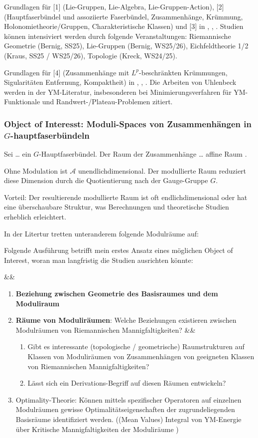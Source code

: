 \documentclass[10pt, letterpaper]{article}
\newenvironment{romanenum}[1][]
  {%
    \ifx&#1&%
    \else
      \textbf{#1}\quad %
    \fi
    \begin{enumerate}[label=\roman*)] %
  }
  {%
    \end{enumerate}%
  }
\theoremstyle{custom}
\theoremstyle{definition}
\begin{document}
Grundlagen für [1] (Lie-Gruppen, Lie-Algebra, Lie-Gruppen-Action), [2] (Hauptfaserbündel und assoziierte Faserbündel, Zusammenhänge, Krümmung, Holonomietheorie/Gruppen, Charakteristische Klassen) und [3] in \cite{baum2014eichfeld}, \cite{hamilton2017gauge}, \cite{husemoller1975fibre}. Studien können intensiviert werden durch folgende Veranstaltungen: Riemannische Geometrie (Bernig, SS25), Lie-Gruppen (Bernig, WS25/26), Eichfeldtheorie 1/2 (Kraus, SS25 / WS25/26), Topologie (Kreck, WS24/25).

Grundlagen für [4] (Zusammenhänge mit $L^p$-beschränkten Krümmungen, Sigularitäten Entfernung, Kompaktheit) in \cite{uhlenbeck1982connections}, \cite{uhlenbeck1982removable}, \cite{wehrheim2021uhlenbeck}. Die Arbeiten von Uhlenbeck werden in der YM-Literatur, insbesonderen bei Minimierungsverfahren für YM-Funktionale und Randwert-/Plateau-Problemen zitiert.  



\subsubsection{Object of Interesst: Moduli-Spaces von Zusammenhängen in $G$-hauptfaserbündeln} 

Sei … ein $G$-Hauptfaserbündel. Der Raum der Zusammenhänge … affine Raum .

Ohne Modulation ist $\mathcal{A}$ unendlichdimensional. Der modullierte Raum reduziert diese Dimension durch die Quotientierung nach der Gauge-Gruppe $G$.

Vorteil: Der resultierende modullierte Raum ist oft endlichdimensional oder hat eine überschaubare Struktur, was Berechnungen und theoretische Studien erheblich erleichtert.

In der Litertur tretten unteranderem folgende Modulräume auf:




Folgende Ausführung betrifft mein erstes Ansatz eines möglichen Object of Interest, woran man langfristig die Studien ausrichten könnte: 

\begin{romanenum}
    \item \textbf{Beziehung zwischen Geometrie des Basisraumes und dem Moduliraum}
    \item \textbf{Räume von Moduliräumen}: Welche Beziehungen existieren zwischen Modulräumen von Riemannischen Mannigfaltigkeiten? 
    \begin{romanenum}
        \item Gibt es interessante (topologische / geometrische) Raumstrukturen auf Klassen von Moduliräumen von Zusammenhängen von geeigneten Klassen von Riemannischen Mannigfaltigkeiten? 
        \item Lässt sich ein Derivations-Begriff auf diesen Räumen entwickeln?
    \end{romanenum}
    \item Optimality-Theorie: Können mittels spezifischer Operatoren auf einzelnen Modulräumen gewisse Optimalitätseigenschaften der zugrundeliegenden Basisräume identifiziert werden. ((Mean Values) Integral von YM-Energie über Kritische Mannigfaltigkeiten der Moduliräume \cite{swoboda2018morse})
\end{romanenum}
\end{document}
